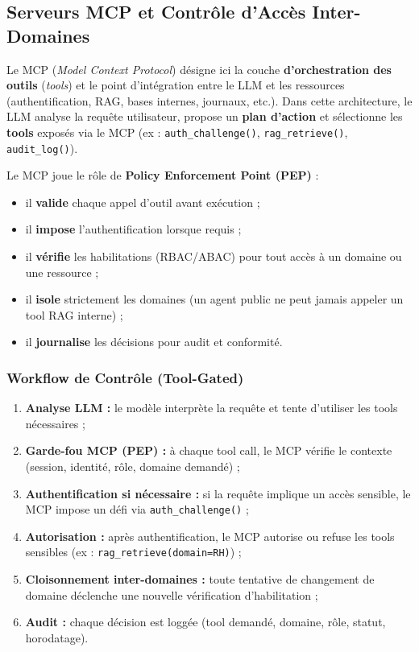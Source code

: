 \documentclass[12pt, a4paper]{report}
\begin{document}
\subsection{Serveurs MCP et Contrôle d'Accès Inter-Domaines}

Le MCP (\textit{Model Context Protocol}) désigne ici la couche
\textbf{d'orchestration des outils} (\textit{tools}) et le point
d'intégration entre le LLM et les ressources (authentification, RAG,
bases internes, journaux, etc.). Dans cette architecture, le LLM analyse
la requête utilisateur, propose un \textbf{plan d'action} et sélectionne
les \textbf{tools} exposés via le MCP
(ex : \texttt{auth\_challenge()}, \texttt{rag\_retrieve()},
\texttt{audit\_log()}).

Le MCP joue le rôle de \textbf{Policy Enforcement Point (PEP)} :

\begin{itemize}
  \item il \textbf{valide} chaque appel d'outil avant exécution ;
  \item il \textbf{impose} l'authentification lorsque requis ;
  \item il \textbf{vérifie} les habilitations (RBAC/ABAC) pour tout
        accès à un domaine ou une ressource ;
  \item il \textbf{isole} strictement les domaines (un agent public ne
        peut jamais appeler un tool RAG interne) ;
  \item il \textbf{journalise} les décisions pour audit et conformité.
\end{itemize}

\subsubsection{Workflow de Contrôle (Tool-Gated)}

\begin{enumerate}
  \item \textbf{Analyse LLM :} le modèle interprète la requête et tente
        d'utiliser les tools nécessaires ;
  \item \textbf{Garde-fou MCP (PEP) :} à chaque tool call, le MCP
        vérifie le contexte (session, identité, rôle, domaine demandé) ;
  \item \textbf{Authentification si nécessaire :} si la requête implique
        un accès sensible, le MCP impose un défi via
        \texttt{auth\_challenge()} ;
  \item \textbf{Autorisation :} après authentification, le MCP autorise
        ou refuse les tools sensibles
        (ex : \texttt{rag\_retrieve(domain=RH)}) ;
  \item \textbf{Cloisonnement inter-domaines :} toute tentative de
        changement de domaine déclenche une nouvelle vérification
        d'habilitation ;
  \item \textbf{Audit :} chaque décision est loggée (tool demandé,
        domaine, rôle, statut, horodatage).
\end{enumerate}
\end{document}
